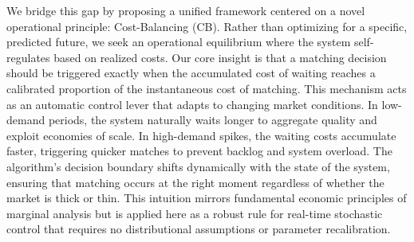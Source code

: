 We bridge this gap by proposing a unified framework centered on a novel operational principle: Cost-Balancing (CB).
Rather than optimizing for a specific, predicted future, we seek an operational equilibrium where the system self-regulates based on realized costs.
Our core insight is that a matching decision should be triggered exactly when the accumulated cost of waiting reaches a calibrated proportion of the instantaneous cost of matching.
This mechanism acts as an automatic control lever that adapts to changing market conditions. 
In low-demand periods, the system naturally waits longer to aggregate quality and exploit economies of scale. 
In high-demand spikes, the waiting costs accumulate faster, triggering quicker matches to prevent backlog and system overload.
The algorithm's decision boundary shifts dynamically with the state of the system, ensuring that matching occurs at the right moment regardless of whether the market is thick or thin.
This intuition mirrors fundamental economic principles of marginal analysis but is applied here as a robust rule for real-time stochastic control that requires no distributional assumptions or parameter recalibration.

